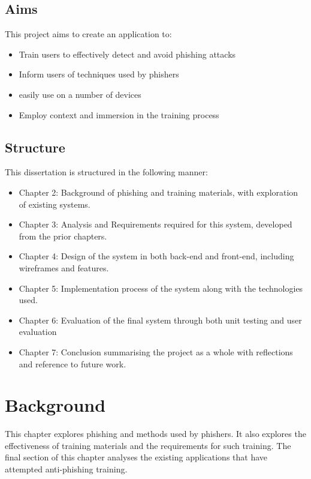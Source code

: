 \documentclass{l4proj}
\begin{document}
\section{Aims}
This project aims to create an application to:
\begin{itemize}
    \item Train users to effectively detect and avoid phishing attacks
    \item Inform users of techniques used by phishers
    \item easily use on a number of devices
    \item Employ context and immersion in the training process
\end{itemize}

\section{Structure}
This dissertation is structured in the following manner:
\begin{itemize}
    \item Chapter 2: Background of phishing and training materials, with exploration of existing systems.
    \item Chapter 3: Analysis and Requirements required for this system, developed from the prior chapters.
    \item Chapter 4: Design of the system in both back-end and front-end, including wireframes and features.
    \item Chapter 5: Implementation process of the system along with the technologies used.
    \item Chapter 6: Evaluation of the final system through both unit testing and user evaluation
    \item Chapter 7: Conclusion summarising the project as a whole with reflections and reference to future work.
\end{itemize}




\chapter{Background}

This chapter explores phishing and methods used by phishers. It also explores the effectiveness of training materials and the requirements for such training. The final section of this chapter analyses the existing applications that have attempted anti-phishing training.
\end{document}
